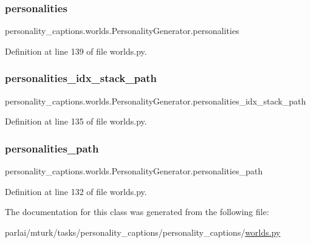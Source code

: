 \subsubsection{\texorpdfstring{personalities}{personalities}}
{\footnotesize\ttfamily personality\+\_\+captions.\+worlds.\+Personality\+Generator.\+personalities}



Definition at line 139 of file worlds.\+py.

\mbox{\label{classpersonality__captions_1_1worlds_1_1PersonalityGenerator_ad1e7cbf0a184bb37c8f5220218cbb524}} 
\subsubsection{\texorpdfstring{personalities\+\_\+idx\+\_\+stack\+\_\+path}{personalities\_idx\_stack\_path}}
{\footnotesize\ttfamily personality\+\_\+captions.\+worlds.\+Personality\+Generator.\+personalities\+\_\+idx\+\_\+stack\+\_\+path}



Definition at line 135 of file worlds.\+py.

\mbox{\label{classpersonality__captions_1_1worlds_1_1PersonalityGenerator_aab870fd5462e825716eb0e2a996671e2}} 
\subsubsection{\texorpdfstring{personalities\+\_\+path}{personalities\_path}}
{\footnotesize\ttfamily personality\+\_\+captions.\+worlds.\+Personality\+Generator.\+personalities\+\_\+path}



Definition at line 132 of file worlds.\+py.



The documentation for this class was generated from the following file\+:\begin{DoxyCompactItemize}
\item 
parlai/mturk/tasks/personality\+\_\+captions/personality\+\_\+captions/\hyperlink{parlai_2mturk_2tasks_2personality__captions_2personality__captions_2worlds_8py}{worlds.\+py}\end{DoxyCompactItemize}
